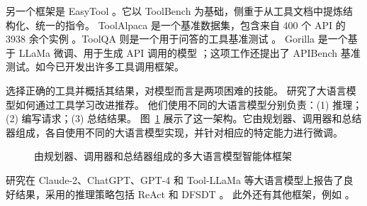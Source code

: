 另一个框架是 EasyTool
\citep{yuan2024easytool}。它以 ToolBench 为基础，侧重于从工具文档中提炼结构化、统一的指令。
ToolAlpaca 是一个基准数据集，包含来自 400 个 API 的 3938 余个实例
\citep{tang2023toolalpaca}。ToolQA 则是一个用于问答的工具基准测试 \citep{zhuang2023toolqa}。
Gorilla 是一个基于 LLaMa 微调、用于生成 API 调用的模型
\citep{patil2023gorillalargelanguagemodel}；这项工作还提出了 APIBench 基准测试。如今已开发出许多工具调用框架。

选择正确的工具并概括其结果，对模型而言是两项困难的技能。\citet{zhao2024let,shen2024small} 研究了大语言模型如何通过工具学习改进推荐。
他们使用不同的大语言模型分别负责：(1) 推理；(2) 编写请求；(3) 总结结果。
图~\ref{fig:alpha} 展示了这一架构。它由规划器、调用器和总结器组成，各自使用不同的大语言模型实现，并针对相应的特定能力进行微调。
\begin{figure}
  \begin{center}
    
    \caption{由规划器、调用器和总结器组成的多大语言模型智能体框架 \citep{shen2024small}}\label{fig:alpha}
  \end{center}
\end{figure}
研究在 Claude-2、ChatGPT、GPT-4 和 Tool-LLaMa 等大语言模型上报告了良好结果，采用的推理策略包括 ReAct \citep{yao2022react} 和
DFSDT \citep{qin2023toolllm}。
此外还有其他框架，例如 \citep{ocker2024tulip}。



